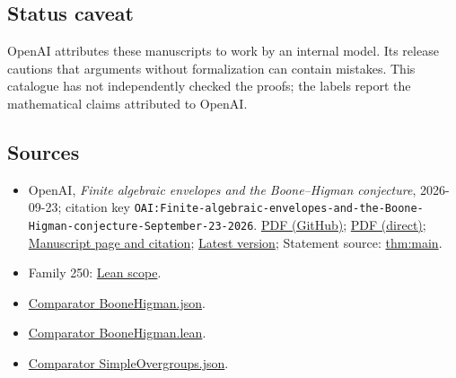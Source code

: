 \documentclass[11pt]{article}
\begin{document}
\subsection{Status caveat}
OpenAI attributes these manuscripts to work by an internal model. Its release cautions that arguments without formalization can contain mistakes. This catalogue has not independently checked the proofs; the labels report the mathematical claims attributed to OpenAI.

\subsection{Sources}
\begin{itemize}
\item OpenAI, \emph{Finite algebraic envelopes and the Boone–Higman conjecture}, 2026-09-23; citation key \texttt{OAI:Finite-algebraic-envelopes-and-the-Boone-Higman-conjecture-September-23-2026}. \href{https://github.com/openai/math/blob/adc7f1241b42e322a6451854ab7e4b4c146bf78a/preprints/Finite-algebraic-envelopes-and-the-Boone-Higman-conjecture-September-23-2026/paper.pdf}{PDF (GitHub)}; \href{https://github.com/openai/math/raw/adc7f1241b42e322a6451854ab7e4b4c146bf78a/preprints/Finite-algebraic-envelopes-and-the-Boone-Higman-conjecture-September-23-2026/paper.pdf}{PDF (direct)}; \href{https://github.com/openai/math/blob/adc7f1241b42e322a6451854ab7e4b4c146bf78a/preprints/Finite-algebraic-envelopes-and-the-Boone-Higman-conjecture-September-23-2026/README.md}{Manuscript page and citation}; \href{https://github.com/openai/math/blob/main/preprints/Finite-algebraic-envelopes-and-the-Boone-Higman-conjecture-September-23-2026/paper.pdf}{Latest version}; Statement source: \href{https://github.com/openai/math/blob/adc7f1241b42e322a6451854ab7e4b4c146bf78a/preprints/Finite-algebraic-envelopes-and-the-Boone-Higman-conjecture-September-23-2026/build/introduction.tex\#L9}{thm:main}.
\item Family 250: \href{https://github.com/openai/math/blob/adc7f1241b42e322a6451854ab7e4b4c146bf78a/lean/docs/250.md}{Lean scope}.
\item \href{https://github.com/openai/math/blob/adc7f1241b42e322a6451854ab7e4b4c146bf78a/lean/ComparatorChallenges/BooneHigman.json}{Comparator BooneHigman.json}.
\item \href{https://github.com/openai/math/blob/adc7f1241b42e322a6451854ab7e4b4c146bf78a/lean/ComparatorChallenges/BooneHigman.lean}{Comparator BooneHigman.lean}.
\item \href{https://github.com/openai/math/blob/adc7f1241b42e322a6451854ab7e4b4c146bf78a/lean/ComparatorChallenges/SimpleOvergroups.json}{Comparator SimpleOvergroups.json}.

\end{itemize}
\end{document}
